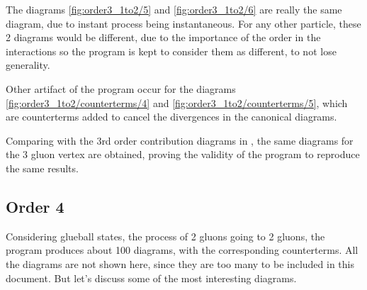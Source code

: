 \documentclass[11pt,a4paper,twoside,pdf]{article}
\numberwithin{equation}{section}
\begin{document}
The diagrams \ref{fig:order3_1to2/5} and \ref{fig:order3_1to2/6} are really the same 
diagram, due to instant process being instantaneous. For any other particle, these 
2 diagrams would be different, due to the importance of the order in the interactions
so the program is kept to consider them as different, to not lose generality.

Other artifact of the program occur for the diagrams \ref{fig:order3_1to2/counterterms/4} and
\ref{fig:order3_1to2/counterterms/5}, which are counterterms added to cancel the divergences
in the canonical diagrams.

Comparing with the 3rd order contribution diagrams in \cite{QCDG}, the same diagrams
for the 3 gluon vertex are obtained, proving the validity of the program to reproduce the same results.



\subsection{Order 4}

Considering glueball states, the process of 2 gluons going to 2 gluons, the program
produces about 100 diagrams, with the corresponding counterterms. All the diagrams are
not shown here, since they are too many to be included in this document. But let's 
discuss some of the most interesting diagrams.
\end{document}
